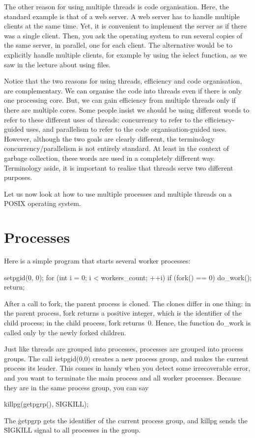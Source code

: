 The other reason for using multiple threads is code organisation.
Here, the standard example is that of a web server.
A web server has to handle multiple clients at the same time.
Yet, it is convenient to implement the server as if there was a single client.
Then, you ask the operating system to run several copies of the same server,
  in parallel, one for each client.
The alternative would be to explicitly handle multiple clients,
  for example by using the \.{select} function,
  as we saw in the lecture about using files.

Notice that the two reasons for using threads, efficiency and code organisation,
  are complementary.
We can organise the code into threads even if there is only one processing core.
But, we can gain efficiency from multiple threads only if there are multiple cores.
Some people insist we should be using different words
  to refer to these different uses of threads:
  concurrency to refer to the efficiency-guided uses,
  and parallelism to refer to the code organisation-guided uses.
However, although the two goals are clearly different,
  the terminology concurrency\slash parallelism is not entirely standard.
At least in the context of garbage collection,
  these words are used in a completely different way.
Terminology aside,
  it is important to realise that threads serve two different purposes.

Let us now look at how to use multiple processes and multiple threads
  on a POSIX operating system.

\section*{Processes}

Here is a simple program that starts several worker processes:
\begin{ccode}
setpgid(0, 0);
for (int i = 0; i < workers_count; ++i) if (fork() == 0) { do_work(); return; }
\end{ccode}
After a call to \.{fork}, the parent process is cloned.
The clones differ in one thing:
  in the parent process, \.{fork} returns a positive integer,
    which is the identifier of the child process;
  in the child process, \.{fork} returns~0.
Hence, the function \.{do\_work} is called only by the newly forked children.

Just like threads are grouped into processes,
  processes are grouped into process groups.
The call \.{setpgid(0,0)} creates a new process group,
  and makes the current process its leader.
This comes in handy when you detect some irrecoverable error,
  and you want to terminate the main process and all worker processes.
Because they are in the same process group, you can say
\begin{ccode}
killpg(getpgrp(), SIGKILL);
\end{ccode}
The \.{getpgrp} gets the identifier of the current process group,
  and \.{killpg} sends the \.{SIGKILL} signal to all processes in the group.

